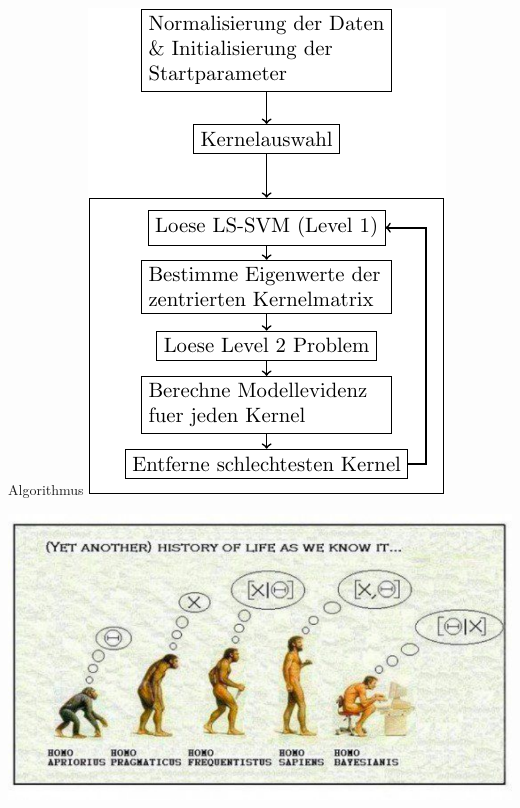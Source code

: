 \documentclass{beamer}
\begin{document}
{\begin{frame}{Algorithmus}
	\centering\includegraphics[scale=0.9]{Algo.pdf}
\end{frame}

\begin{frame}
	\centering\includegraphics[scale=0.7]{humanshistory.pdf}
\end{frame}







}
\end{document}
